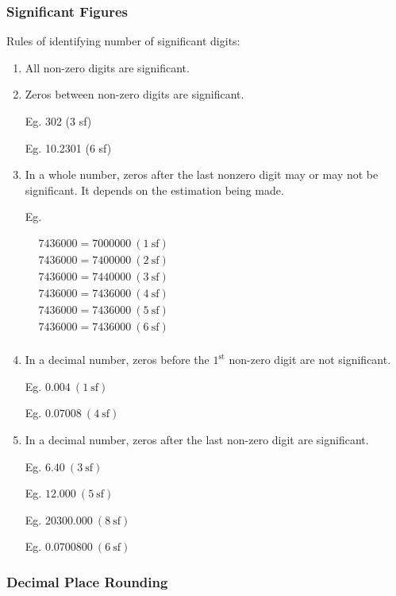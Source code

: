 \documentclass[twocolumn]{article}
\begin{document}
\subsubsection*{Significant Figures}

\noindent
Rules of identifying number of significant digits:

\begin{enumerate} 
\item All non-zero digits are significant.
\item Zeros between non-zero digits are significant. 

Eg. 302 (3 sf)

Eg. 10.2301 (6 sf)

\item In a whole number, zeros after the last nonzero digit may or may not be significant. It depends on the estimation being made.

Eg.

$
\begin{aligned}
	& 7436000=7000000 \ (1 \ \mathrm{sf}) \\
	& 7436000=7400000 \ (2 \ \mathrm{sf}) \\
	& 7436000=7440000 \ (3 \ \mathrm{sf}) \\
	& 7436000=7436000 \ (4 \ \mathrm{sf}) \\
	& 7436000=7436000 \ (5 \ \mathrm{sf}) \\
	& 7436000=7436000 \ (6 \ \mathrm{sf}) \\
\end{aligned}
$

\item In a decimal number, zeros before the $1^{\text{st}}$ non-zero digit are not significant.

Eg. $0.004 \ (1 \ \mathrm{sf})$

Eg. $0.07008 \ (4 \ \mathrm{sf})$

\item In a decimal number, zeros after the last non-zero digit are significant.

Eg. $6.40 \ (3 \ \mathrm{sf})$

Eg. $12.000 \ (5 \ \mathrm{sf})$

Eg. $20300.000 \ (8 \ \mathrm{sf})$

Eg. $0.0700800 \ (6 \ \mathrm{sf})$
\end{enumerate} 

\subsubsection*{Decimal Place Rounding}
\end{document}
